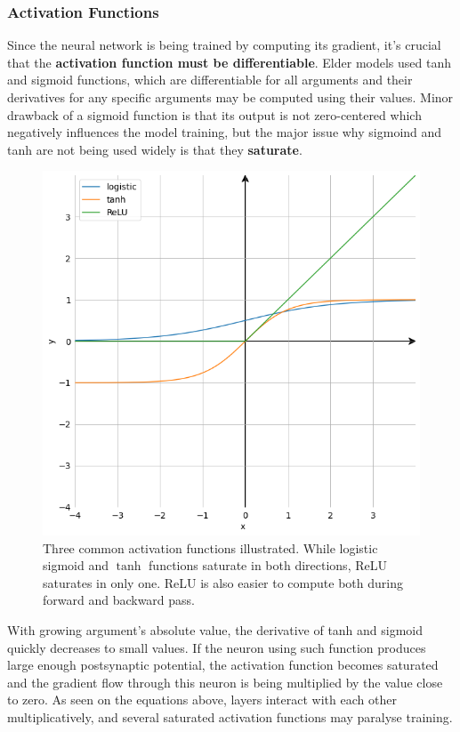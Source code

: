 \documentclass[thesis=B,english]{FITthesis}[2019/12/23]
\begin{document}
	\subsubsection{Activation Functions}
	
	Since the neural network is being trained by computing its gradient, it's crucial that the \textbf{activation function must be differentiable}. Elder models used tanh and sigmoid functions, which are differentiable for all arguments and their derivatives for any specific arguments may be computed using their values. Minor drawback of a sigmoid function is that its output is not zero-centered which negatively influences the model training, but the major issue why sigmoind and tanh are not being used widely is that they \textbf{saturate}.
	
	\begin{figure}[h]
		\centering
		\includegraphics[scale=0.35]{images/activations.png}
		\caption{Three common activation functions illustrated. While logistic sigmoid and $\tanh$ functions saturate in both directions, ReLU saturates in only one. ReLU is also easier to compute both during forward and backward pass.}
	\end{figure}
	
	With growing argument's absolute value, the derivative of tanh and sigmoid quickly decreases to small values. If the neuron using such function produces large enough postsynaptic potential, the activation function becomes saturated and the gradient flow through this neuron is being multiplied by the value close to zero. As seen on the equations above, layers interact with each other multiplicatively, and several saturated activation functions may paralyse training.
	
\end{document}
